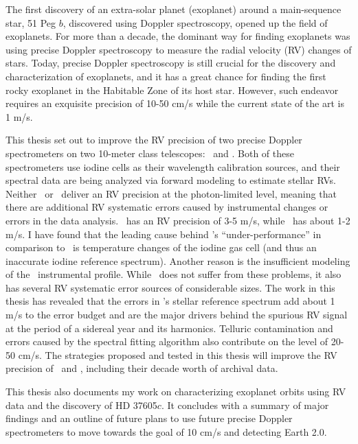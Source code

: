 The first discovery of an extra-solar planet (exoplanet) around a
main-sequence star, 51 Peg $b$, discovered using Doppler spectroscopy,
opened up the field of exoplanets. For more than a decade, the
dominant way for finding exoplanets was using precise Doppler
spectroscopy to measure the radial velocity (RV) changes of
stars. Today, precise Doppler spectroscopy is still crucial for the
discovery and characterization of exoplanets, and it has a great
chance for finding the first rocky exoplanet in the Habitable Zone of
its host star. However, such endeavor requires an exquisite precision
of 10-50 cm/s while the current state of the art is 1 m/s.

This thesis set out to improve the RV precision of two precise Doppler
spectrometers on two 10-meter class telescopes: \het\ and \keck. Both
of these spectrometers use iodine cells as their wavelength
calibration sources, and their spectral data are being analyzed via
forward modeling to estimate stellar RVs. Neither \het\ or \keck\
deliver an RV precision at the photon-limited level, meaning that
there are additional RV systematic errors caused by instrumental
changes or errors in the data analysis. \het\ has an RV precision of
3-5 m/s, while \keck\ has about 1-2 m/s. I have found that the leading
cause behind \het's ``under-performance'' in comparison to \keck\ is
temperature changes of the iodine gas cell (and thus an inaccurate
iodine reference spectrum). Another reason is the insufficient
modeling of the \het\ instrumental profile. While \keck\ does not
suffer from these problems, it also has several RV systematic error
sources of considerable sizes. The work in this thesis has revealed
that the errors in \keck's stellar reference spectrum add about 1 m/s
to the error budget and are the major drivers behind the spurious RV
signal at the period of a sidereal year and its harmonics. Telluric
contamination and errors caused by the spectral fitting algorithm also
contribute on the level of 20-50 cm/s. The strategies proposed and
tested in this thesis will improve the RV precision of \het\ and
\keck, including their decade worth of archival data.

This thesis also documents my work on characterizing exoplanet orbits
using RV data and the discovery of HD 37605$c$. It concludes with a
summary of major findings and an outline of future plans to use future
precise Doppler spectrometers to move towards the goal of 10 cm/s and
detecting Earth 2.0.


